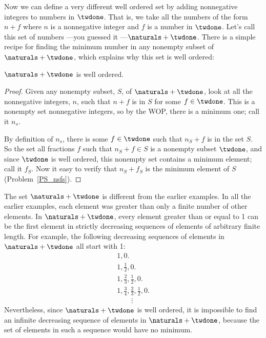 Now we can define a very different well ordered set by adding
nonnegative integers to numbers in $\twdone$.  That is, we take all
the numbers of the form $n + f$ where $n$ is a nonnegative integer and
$f$ is a number in $\twdone$.  Let's call this set of numbers ---you
guessed it ---$\naturals + \twdone$.  There is a simple recipe for
finding the minimum number in any nonempty subset of $\naturals +
\twdone$, which explains why this set is well ordered:

\begin{lemma}\label{to1_well-order}
$\naturals + \twdone$ is well ordered.
\end{lemma}

\begin{proof}
Given any nonempty subset, $S$, of $\naturals + \twdone$, look at all
the nonnegative integers, $n$, such that $n+f$ is in $S$ for some $f
\in \twdone$.  This is a nonempty set nonnegative integers, so by the
WOP, there is a minimum one; call it $n_s$.

By definition of $n_s$, there is some $f \in \twdone$ such that
$n_S+f$ is in the set $S$.  So the set all fractions $f$ such that
$n_S+f \in S$ is a nonempty subset $\twdone$, and since $\twdone$ is
well ordered, this nonempty set contains a minimum element; call it
$f_S$.  Now it easy to verify that $n_S+f_S$ is
the minimum element of $S$ (Problem~\ref{PS_nsfs}).
\end{proof}

The set $\naturals + \twdone$ is different from the earlier examples.
In all the earlier examples, each element was greater than
only a finite number of other elements.  In $\naturals + \twdone$, every
element greater than or equal to 1 can be the first element in
strictly decreasing sequences of elements of arbitrary finite length.
For example, the following decreasing sequences of elements in
$\naturals + \twdone$ all start with 1:
\[\begin{array}{l}
1, 0.\\
1, \frac12, 0.\\
1, \frac23, \frac12, 0.\\
1,  \frac34, \frac23, \frac12, 0.\\
\qquad\vdots
\end{array}\]
Nevertheless, since $\naturals + \twdone$ is well ordered, it is
impossible to find an infinite decreasing sequence of elements in
$\naturals + \twdone$, because the set of elements in such a sequence
would have no minimum.

\begin{problems}
\homeworkproblems
{}

\practiceproblems
{}

\classproblems
{}

\end{problems}
\endinput


